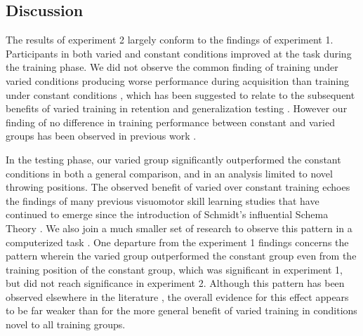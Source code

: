 \documentclass[
  12pt,
  letterpaper,
]{article}
\begin{document}
\subsection{Discussion}\label{discussion-1}

The results of experiment 2 largely conform to the findings of
experiment 1. Participants in both varied and constant conditions
improved at the task during the training phase. We did not observe the
common finding of training under varied conditions producing worse
performance during acquisition than training under constant conditions
\autocite{catalanoDistantTransferCoincident1984a,wrisbergVariabilityPracticeHypothesis1987},
which has been suggested to relate to the subsequent benefits of varied
training in retention and generalization testing
\autocite{soderstromLearningPerformanceIntegrative2015}. However our
finding of no difference in training performance between constant and
varied groups has been observed in previous work
\autocite{chuaPracticeVariabilityPromotes2019,moxleySchemaVariabilityPractice1979,pigottMotorSchemaStructure1984}.

In the testing phase, our varied group significantly outperformed the
constant conditions in both a general comparison, and in an analysis
limited to novel throwing positions. The observed benefit of varied over
constant training echoes the findings of many previous visuomotor skill
learning studies that have continued to emerge since the introduction of
Schmidt's influential Schema Theory
\autocite{catalanoDistantTransferCoincident1984a,chuaPracticeVariabilityPromotes2019,goodwinEffectDifferentQuantities1998,mccrackenTestSchemaTheory1977,moxleySchemaVariabilityPractice1979,newellVariabilityPracticeTransfer1976,pigottMotorSchemaStructure1984,rollerVariablePracticeLenses2001,schmidtSchemaTheoryDiscrete1975,willeyLongtermMotorLearning2018,wrisbergVariabilityPracticeHypothesis1987,wulfEffectTypePractice1991}.
We also join a much smaller set of research to observe this pattern in a
computerized task \autocite{seowTransferEffectsVaried2019}. One
departure from the experiment 1 findings concerns the pattern wherein
the varied group outperformed the constant group even from the training
position of the constant group, which was significant in experiment 1,
but did not reach significance in experiment 2. Although this pattern
has been observed elsewhere in the literature
\autocite{goodeSuperiorityVariableRepeated2008,kerrSpecificVariedPractice1978},
the overall evidence for this effect appears to be far weaker than for
the more general benefit of varied training in conditions novel to all
training groups.
\end{document}
